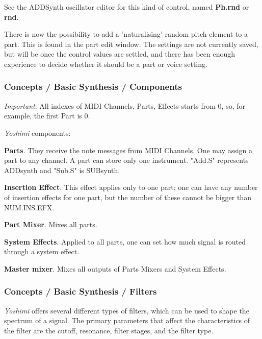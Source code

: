    See the ADDSynth oscillator editor for this kind of
   control, named \textbf{Ph.rnd} or \textbf{rnd}.

   There is now the possibility to add a 'naturalising' random pitch element
   to a part. This is found in the part edit window. The settings are not
   currently saved, but will be once the control values are settled, and
   there has been enough experience to decide whether it should be a part or
   voice setting.

\subsubsection{Concepts / Basic Synthesis / Components}
\label{subsubsec:concepts_basics_components}

   \textsl{Important}:
   All indexes of MIDI Channels, Parts, Effects starts from 0, so, for
   example, the first Part is 0.

   \textsl{Yoshimi} components:

   \begin{enumber}
      \item \textbf{Parts}.
         They receive the note messages from MIDI
         Channels. One may assign a part to any channel. A part can store
         only one instrument.  "Add.S" represents ADDsynth and "Sub.S" is
         SUBsynth.
      \item \textbf{Insertion Effect}.
         This effect applies only to one part; one can have any number of
         insertion effects for one part, but the number of these cannot be
         bigger than NUM.INS.EFX.
      \item \textbf{Part Mixer}.
         Mixes all parts.
      \item \textbf{System Effects}.
         Applied to all parts, one can set how much signal
         is routed through a system effect.
      \item \textbf{Master mixer}.
         Mixes all outputs of Parts Mixers and System Effects.
   \end{enumber}

\subsubsection{Concepts / Basic Synthesis / Filters}
\label{subsubsec:concepts_basics_filters}

   \textsl{Yoshimi}
   offers several different types of filters, which can be used
   to shape the spectrum of a signal. The primary parameters that affect the
   characteristics of the filter are the cutoff, resonance, filter stages,
   and the filter type.

